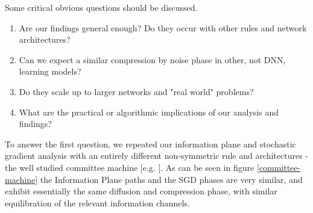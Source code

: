 \documentclass[11pt]{article}
\begin{document}
Some critical obvious questions should be discussed. 
\begin{enumerate}
\item Are our findings general enough? Do they occur with other rules and network architectures? 
\item Can we expect a similar compression by noise phase in other, not DNN, learning models? 
\item Do they scale up to larger networks and "real world" problems?
\item What are the practical or algorithmic implications of our analysis and findings?
\end{enumerate}
To answer the first question, we repeated our information plane and stochastic gradient analysis with an entirely different non-symmetric rule and architectures - the well studied committee machine [e.g. \citet{Haykin:1998:NNC:521706}]. As can be seen in figure \ref{committee-machine} the Information Plane paths and the SGD phases are very similar, and exhibit essentially the same diffusion and compression phase, with similar equilibration of the relevant information channels.
\end{document}
